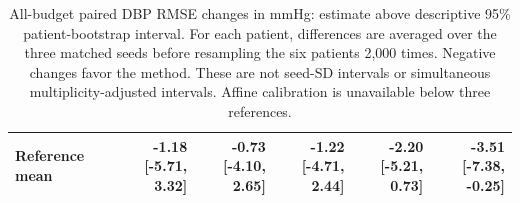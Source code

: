 \documentclass[11pt]{article}
\begin{document}
\begin{table}[!htbp]
\begin{tabular}{lrrrrr}
Reference mean & \shortstack{-1.18\\{[-5.71, 3.32]}} & \shortstack{-0.73\\{[-4.10, 2.65]}} & \shortstack{-1.22\\{[-4.71, 2.44]}} & \shortstack{-2.20\\{[-5.21, 0.73]}} & \shortstack{-3.51\\{[-7.38, -0.25]}}\\
\bottomrule\end{tabular}
\caption{All-budget paired DBP RMSE changes in mmHg: estimate above descriptive 95\% patient-bootstrap interval. For each patient, differences are averaged over the three matched seeds before resampling the six patients 2,000 times. Negative changes favor the method. These are not seed-SD intervals or simultaneous multiplicity-adjusted intervals. Affine calibration is unavailable below three references.}\end{table}
\end{document}
